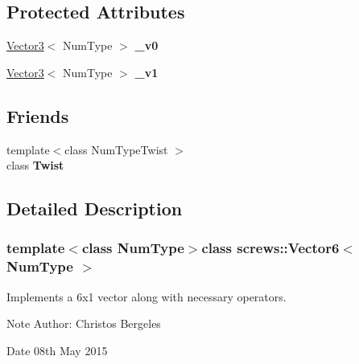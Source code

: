\subsection*{Protected Attributes}
\begin{DoxyCompactItemize}
\item 
\hypertarget{singletonscrews_1_1_vector6_a84a6ae17f0464178f3bb0213475041b8}{\hyperlink{singletonscrews_1_1_translation}{Vector3}$<$ Num\+Type $>$ {\bfseries \+\_\+v0}}\label{singletonscrews_1_1_vector6_a84a6ae17f0464178f3bb0213475041b8}

\item 
\hypertarget{singletonscrews_1_1_vector6_a153fd28ef134a176c7c7f3dd7646d36d}{\hyperlink{singletonscrews_1_1_translation}{Vector3}$<$ Num\+Type $>$ {\bfseries \+\_\+v1}}\label{singletonscrews_1_1_vector6_a153fd28ef134a176c7c7f3dd7646d36d}

\end{DoxyCompactItemize}
\subsection*{Friends}
\begin{DoxyCompactItemize}
\item 
\hypertarget{singletonscrews_1_1_vector6_a90f9fa90695f35a9b08d0e888ea4297e}{{\footnotesize template$<$class Num\+Type\+Twist $>$ }\\class {\bfseries Twist}}\label{singletonscrews_1_1_vector6_a90f9fa90695f35a9b08d0e888ea4297e}

\end{DoxyCompactItemize}


\subsection{Detailed Description}
\subsubsection*{template$<$class Num\+Type$>$class screws\+::\+Vector6$<$ Num\+Type $>$}

Implements a 6x1 vector along with necessary operators. 

\begin{DoxyNote}{Note}
Author\+: Christos Bergeles 
\end{DoxyNote}
\begin{DoxyDate}{Date}
08th May 2015 
\end{DoxyDate}


